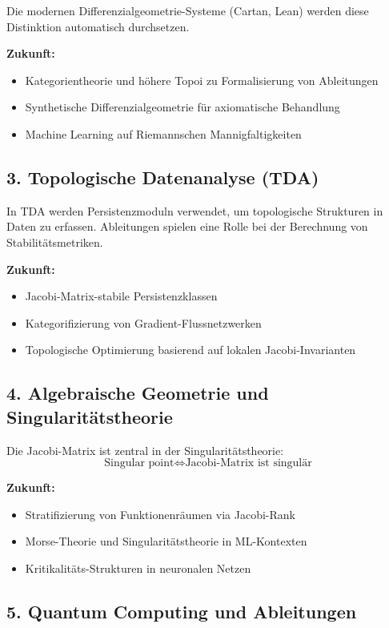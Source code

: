 ﻿\documentclass[a4paper,12pt]{article}
\theoremstyle{definition}
\begin{document}
Die modernen Differenzialgeometrie-Systeme (Cartan, Lean) werden diese Distinktion automatisch durchsetzen.

\textbf{Zukunft:}
\begin{itemize}
	\item Kategorientheorie und höhere Topoi zu Formalisierung von Ableitungen
	\item Synthetische Differenzialgeometrie für axiomatische Behandlung
	\item Machine Learning auf Riemannschen Mannigfaltigkeiten
\end{itemize}

\subsection{3. Topologische Datenanalyse (TDA)}

In TDA werden Persistenzmoduln verwendet, um topologische Strukturen in Daten zu erfassen. Ableitungen spielen eine Rolle bei der Berechnung von Stabilitätsmetriken.

\textbf{Zukunft:}
\begin{itemize}
	\item Jacobi-Matrix-stabile Persistenzklassen
	\item Kategorifizierung von Gradient-Flussnetzwerken
	\item Topologische Optimierung basierend auf lokalen Jacobi-Invarianten
\end{itemize}

\subsection{4. Algebraische Geometrie und Singularitätstheorie}

Die Jacobi-Matrix ist zentral in der Singularitätstheorie:
\[
\text{Singular point} \iff \text{Jacobi-Matrix ist singulär}
\]

\textbf{Zukunft:}
\begin{itemize}
	\item Stratifizierung von Funktionenräumen via Jacobi-Rank
	\item Morse-Theorie und Singularitätstheorie in ML-Kontexten
	\item Kritikalitäts-Strukturen in neuronalen Netzen
\end{itemize}

\subsection{5. Quantum Computing und Ableitungen}
\end{document}
